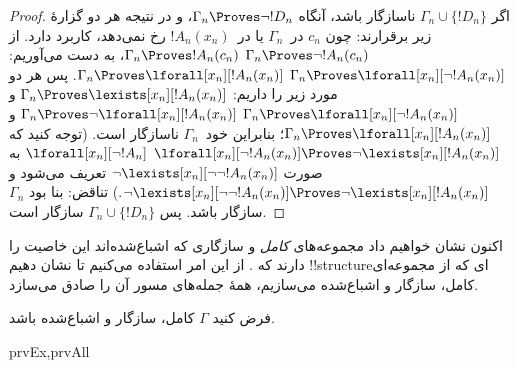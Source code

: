 \documentclass[../../../include/open-logic-section]{subfiles}
\begin{document}
\begin{proof}
اگر $\Gamma_n \cup \{!D_n\}$ ناسازگار باشد، آنگاه
$\Gamma_n \Proves \lnot !D_n$، و در نتیجه هر دو گزارهٔ زیر برقرارند:
چون $c_n$ در~$\Gamma_n$ یا در~$!A_n(x_n)$ رخ نمی‌دهد،
کاربرد دارد. از 
{$\Gamma_n \Proves \lnot !A_n(c_n)$}
{$\Gamma_n \Proves !A_n(c_n)$}،
به دست می‌آوریم:
{$\Gamma_n \Proves \lforall[x_n][\lnot !A_n(x_n)]$}
{$\Gamma_n \Proves \lforall[x_n][!A_n(x_n)]$}.
پس هر دو مورد زیر را داریم:
{$\Gamma_n \Proves \lexists[x_n][!A_n(x_n)]$ و
$\Gamma_n \Proves \lforall[x_n][\lnot !A_n(x_n)]$}
{$\Gamma_n \Proves \lnot\lforall[x_n][!A_n(x_n)]$ و
$\Gamma_n \Proves \lforall[x_n][!A_n(x_n)]$}؛
بنابراین خود~$\Gamma_n$ ناسازگار است.
{(توجه کنید که
{$\lforall[x_n][\lnot !A_n(x_n)] \Proves
  \lnot\lexists[x_n][!A_n(x_n)]$}
{$\lforall[x_n][\lnot !A_n]$ به صورت
  $\lnot\lexists[x_n][\lnot\lnot !A_n(x_n)]$ تعریف می‌شود و
  $\lnot\lexists[x_n][\lnot\lnot !A_n(x_n)] \Proves
  \lnot\lexists[x_n][!A_n(x_n)]$}.)}{}
تناقض: بنا بود $\Gamma_n$ سازگار باشد. پس
$\Gamma_n \cup \{ !D_n\}$ سازگار است.
\end{proof}

\begin{explain}
اکنون نشان خواهیم داد مجموعه‌های \emph{کامل} و سازگاری که اشباع‌شده‌اند
این خاصیت را دارند که 
. از این امر استفاده می‌کنیم تا نشان دهیم !!{structure}ای
که از مجموعه‌ای کامل، سازگار و اشباع‌شده می‌سازیم، همهٔ جمله‌های مسور
آن را صادق می‌سازد.
\end{explain}

\begin{prop}
فرض کنید $\Gamma$ کامل، سازگار و اشباع‌شده باشد.
\begin{tagenumerate}{prvEx,prvAll}
\end{tagenumerate}
\end{prop}
\end{document}

